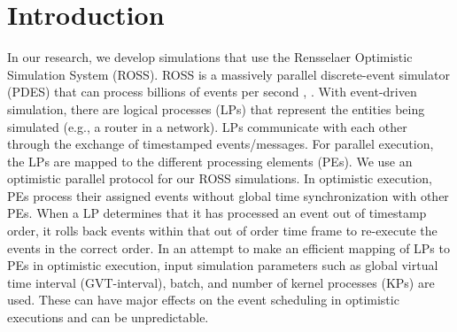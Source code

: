 \documentclass{acm_proc_article-sp}
\begin{document}
\maketitle
%
%

%
%


%
%

%
%






\section{Introduction}
In our research, we develop simulations that use the Rensselaer Optimistic Simulation System (ROSS).  ROSS is a massively parallel discrete-event simulator (PDES) that can process billions of events per second \cite{Holder}, \cite{Bauer}.  With event-driven simulation, there are logical processes (LPs) that represent the entities being simulated (e.g., a router in a network). LPs communicate with each other through the exchange of timestamped events/messages.  For parallel execution, the LPs are mapped to the different processing elements (PEs). We use an optimistic parallel protocol for our ROSS simulations.  In optimistic execution, PEs process their assigned events without global time synchronization with other PEs.  When a LP determines that it has processed an event out of timestamp order, it rolls back events within that out of order time frame to re-execute the events in the correct order. In an attempt to make an efficient mapping of LPs to PEs in optimistic execution, input simulation parameters such as global virtual time interval (GVT-interval), batch, and number of kernel processes (KPs) are used. These can have major effects on the event scheduling in optimistic executions and can be unpredictable.
\end{document}
